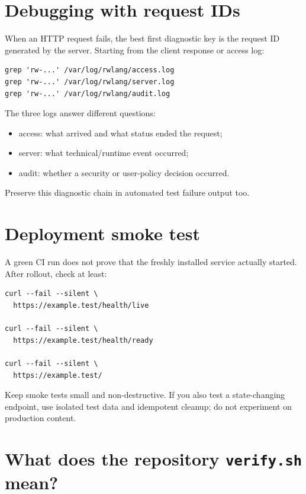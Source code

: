 \section{Debugging with request IDs}

When an HTTP request fails, the best first diagnostic key is the request ID generated by the server. Starting from the client response or access log:

\begin{lstlisting}
grep 'rw-...' /var/log/rwlang/access.log
grep 'rw-...' /var/log/rwlang/server.log
grep 'rw-...' /var/log/rwlang/audit.log
\end{lstlisting}

The three logs answer different questions:

\begin{itemize}
  \item access: what arrived and what status ended the request;
  \item server: what technical/runtime event occurred;
  \item audit: whether a security or user-policy decision occurred.
\end{itemize}

Preserve this diagnostic chain in automated test failure output too.

\section{Deployment smoke test}

A green CI run does not prove that the freshly installed service actually started. After rollout, check at least:

\begin{lstlisting}
curl --fail --silent \
  https://example.test/health/live

curl --fail --silent \
  https://example.test/health/ready

curl --fail --silent \
  https://example.test/
\end{lstlisting}

Keep smoke tests small and non-destructive. If you also test a state-changing endpoint, use isolated test data and idempotent cleanup; do not experiment on production content.

\section{What does the repository \texttt{verify.sh} mean?}

